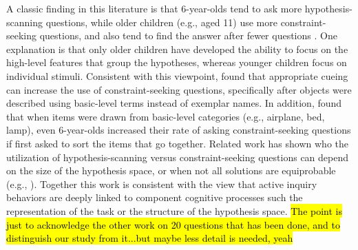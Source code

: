 \documentclass[10pt,letterpaper]{article}
\begin{document}
A classic finding
in this literature is that 6-year-olds tend to ask more hypothesis-scanning questions, 
while older children (e.g., aged 11) use more constraint-seeking  questions, and also 
tend to find the answer after fewer questions \cite{Mosher:1966}. 
One explanation is that only older children have developed the ability to focus on the 
high-level features that group the hypotheses, whereas younger children focus on 
individual stimuli.
Consistent with this viewpoint,
 found that appropriate cueing can increase the use of 
constraint-seeking questions, specifically after objects were described 
using basic-level terms instead of exemplar names.
In addition,  
found that when items were drawn from basic-level categories (e.g., airplane, 
bed, lamp), even 6-year-olds increased their rate of asking constraint-seeking 
questions if first asked to sort the items that go together.   
Related work has shown who the utilization of hypothesis-scanning versus
constraint-seeking questions can depend on the size of the hypothesis space,
or when not all solutions are equiprobable (e.g.,  ).
Together this work is consistent with the view that active inquiry behaviors are deeply linked
to component cognitive processes such the representation of the task or
the structure of the hypothesis space. \hl{The point is just to acknowledge the other work on 20 questions 
that has been done, and to distinguish our study from it...but maybe less detail is needed, yeah}
%




%
% 
%
\end{document}
